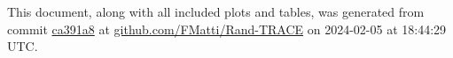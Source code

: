 This document, along with all included plots and tables, was generated from commit \href{https://github.com/FMatti/Rand-SD/tree/ca391a8}{ca391a8} at \href{https://github.com/FMatti/Rand-TRACE}{github.com/FMatti/Rand-TRACE} on 2024-02-05 at 18:44:29 UTC.